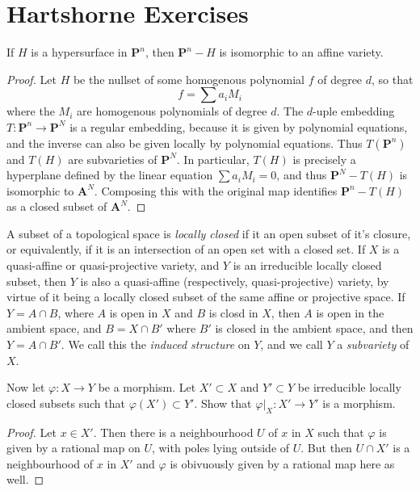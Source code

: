 \chapter{Hartshorne Exercises}

\begin{theorem}
    If $H$ is a hypersurface in $\mathbf{P}^n$, then $\mathbf{P}^n - H$ is isomorphic to an affine variety.
\end{theorem}
\begin{proof}
    Let $H$ be the nullset of some homogenous polynomial $f$ of degree $d$, so that
    \[ f = \sum a_iM_i \]
    where the $M_i$ are homogenous polynomials of degree $d$. The $d$-uple embedding $T: \mathbf{P}^n \to \mathbf{P}^N$ is a regular embedding, because it is given by polynomial equations, and the inverse can also be given locally by polynomial equations. Thus $T(\mathbf{P}^n)$ and $T(H)$ are subvarieties of $\mathbf{P}^N$. In particular, $T(H)$ is precisely a hyperplane defined by the linear equation $\sum a_iM_i = 0$, and thus $\mathbf{P}^N - T(H)$ is isomorphic to $\mathbf{A}^N$. Composing this with the original map identifies $\mathbf{P}^n - T(H)$ as a closed subset of $\mathbf{A}^N$.
\end{proof}

A subset of a topological space is {\it locally closed} if it an open subset of it's closure, or equivalently, if it is an intersection of an open set with a closed set. If $X$ is a quasi-affine or quasi-projective variety, and $Y$ is an irreducible locally closed subset, then $Y$ is also a quasi-affine (respectively, quasi-projective) variety, by virtue of it being a locally closed subset of the same affine or projective space. If $Y = A \cap B$, where $A$ is open in $X$ and $B$ is closd in $X$, then $A$ is open in the ambient space, and $B = X \cap B'$ where $B'$ is closed in the ambient space, and then $Y = A \cap B'$. We call this the {\it induced structure} on $Y$, and we call $Y$ a {\it subvariety} of $X$.

\begin{theorem}
    Now let $\varphi: X \to Y$ be a morphism. Let $X' \subset X$ and $Y' \subset Y$ be irreducible locally closed subsets such that $\varphi(X') \subset Y'$. Show that $\varphi|_X: X' \to Y'$ is a morphism.
\end{theorem}
\begin{proof}
    Let $x \in X'$. Then there is a neighbourhood $U$ of $x$ in $X$ such that $\varphi$ is given by a rational map on $U$, with poles lying outside of $U$. But then $U \cap X'$ is a neighbourhood of $x$ in $X'$ and $\varphi$ is obivuously given by a rational map here as well.
\end{proof}

